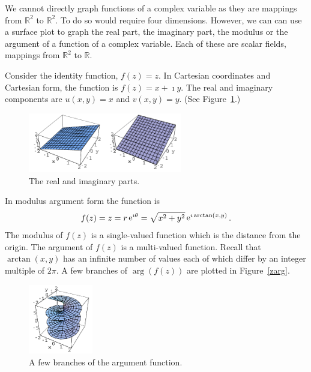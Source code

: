 We cannot directly graph functions of a complex variable as they are 
mappings from $\mathbb{R}^2$ to $\mathbb{R}^2$.  To do so would require four
dimensions.  However, we can can use a surface plot to graph the real part, 
the imaginary part, the modulus or the argument of a function of a complex 
variable.  Each of these are scalar fields, mappings from $\mathbb{R}^2$ to 
$\mathbb{R}$.




\begin{Example}
  Consider the identity function, $f(z) = z$.  In Cartesian coordinates and
  Cartesian form, the function is $f(z) = x + \imath y$.  The real and imaginary
  components are $u(x,y) = x$ and $v(x,y) = y$.  (See Figure~\ref{zreim}.)
  \begin{figure}[htbp!]
    \begin{center}
        \includegraphics[width=0.6\textwidth]{fcv/function/zreim}
    \end{center}
    \caption{The real and imaginary parts.}
    \label{zreim}
  \end{figure}
  In modulus argument form the function is
  \[
  f(z) = z = r \mathop{\mathrm{e}}\nolimits^{\imath \theta} = \sqrt{x^2 + y^2}  \mathop{\mathrm{e}}\nolimits^{\imath \arctan(x,y)}.
  \]
  The modulus of $f(z)$ is a single-valued function which is the distance 
  from the origin.  The argument of $f(z)$ is a multi-valued function.  
  Recall that $\arctan(x,y)$ has an infinite number of values each of
  which differ by an integer multiple of $2 \pi$.  A few branches of 
  $\arg(f(z))$ are plotted in Figure~\ref{zarg}.
  \begin{figure}[htbp!]
    \begin{center}
        \includegraphics[width=0.25\textwidth]{fcv/function/zarg}
    \end{center}
    \caption{A few branches of the argument function.}

\end{figure}
\end{Example}
